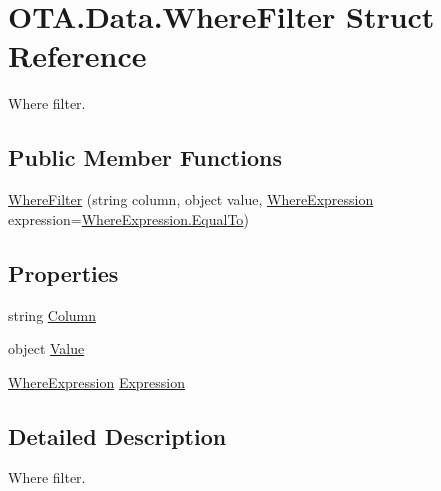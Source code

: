 \hypertarget{struct_o_t_a_1_1_data_1_1_where_filter}{}\section{O\+T\+A.\+Data.\+Where\+Filter Struct Reference}
\label{struct_o_t_a_1_1_data_1_1_where_filter}


Where filter.  


\subsection*{Public Member Functions}
\begin{DoxyCompactItemize}
\item 
\hyperlink{struct_o_t_a_1_1_data_1_1_where_filter_a671ec93e5aa52d6b84da6ec3840a8d06}{Where\+Filter} (string column, object value, \hyperlink{namespace_o_t_a_1_1_data_ac4493f749a9d22b58e2b46dd0b41b61d}{Where\+Expression} expression=\hyperlink{namespace_o_t_a_1_1_data_ac4493f749a9d22b58e2b46dd0b41b61da0242c502bd906e05171e64bad31c7c21}{Where\+Expression.\+Equal\+To})
\end{DoxyCompactItemize}
\subsection*{Properties}
\begin{DoxyCompactItemize}
\item 
string \hyperlink{struct_o_t_a_1_1_data_1_1_where_filter_adfbfe89c2fa82652d4b21a9a1d3e61d1}{Column}
\item 
object \hyperlink{struct_o_t_a_1_1_data_1_1_where_filter_aa3e42f1a208b807654ed853a70788b1d}{Value}
\item 
\hyperlink{namespace_o_t_a_1_1_data_ac4493f749a9d22b58e2b46dd0b41b61d}{Where\+Expression} \hyperlink{struct_o_t_a_1_1_data_1_1_where_filter_aea3259b04d6c9d636e0b499fe492c64f}{Expression}
\end{DoxyCompactItemize}


\subsection{Detailed Description}
Where filter. 



